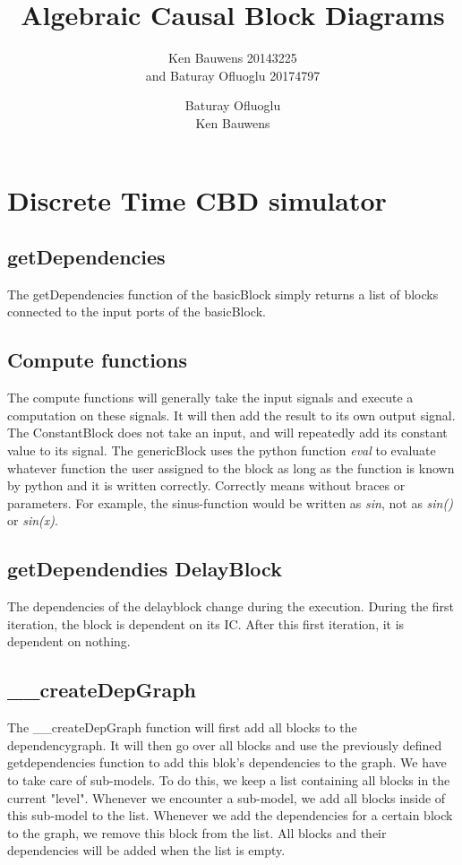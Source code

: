 \documentclass{article}
\title{\vspace{60mm}\textbf{Algebraic Causal Block Diagrams}}
\author{Ken Bauwens 20143225\\and Baturay Ofluoglu 20174797\\}
\author{Baturay Ofluoglu\\Ken Bauwens}
\begin{document}
\maketitle
\pagebreak
\section{Discrete Time CBD simulator}
\subsection{getDependencies}
The getDependencies function of the basicBlock simply returns a list of blocks connected to the input ports of the basicBlock.
\subsection{Compute functions}
The compute functions will generally take the input signals and execute a computation on these signals. It will then add the result to its own output signal. The ConstantBlock does not take an input, and will repeatedly add its constant value to its signal. The genericBlock uses the python function \textit{eval} to evaluate whatever function the user assigned to the block as long as the function is known by python and it is written correctly. Correctly means without braces or parameters. For example, the sinus-function would be written as \textit{sin}, not as \textit{sin()} or \textit{sin(x)}.
\subsection{getDependendies DelayBlock}
The dependencies of the delayblock change during the execution. During the first iteration, the block is dependent on its IC. After this first iteration, it is dependent on nothing. 
\subsection{\_\_createDepGraph}
The \_\_createDepGraph function will first add all blocks to the dependencygraph. It will then go over all blocks and use the previously defined getdependencies function to add this blok's dependencies to the graph. We have to take care of sub-models. To do this, we keep a list containing all blocks in the current "level". Whenever we encounter a sub-model, we add all blocks inside of this sub-model to the list. Whenever we add the dependencies for a certain block to the graph, we remove this block from the list. All blocks and their dependencies will be added when the list is empty.
\end{document}
